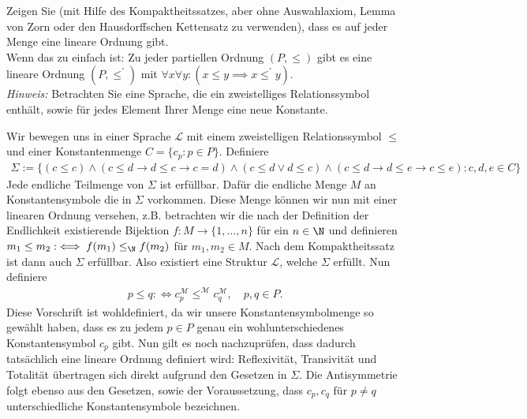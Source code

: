 
\begin{exercise}[133]

Zeigen Sie (mit Hilfe des Kompaktheitssatzes, aber ohne Auswahlaxiom, Lemma von Zorn
oder den Hausdorffschen Kettensatz zu verwenden), dass es auf jeder Menge eine
lineare Ordnung gibt. \\
Wenn das zu einfach ist: Zu jeder partiellen Ordnung $(P,\leq)$ gibt es eine
lineare Ordnung $(P,\leq^{\prime})$ mit $\forall x \forall y: (x \leq y \implies x \leq^{\prime} y)$. \\
\textit{Hinweis:} Betrachten Sie eine Sprache, die ein zweistelliges Relationssymbol
enthält, sowie für jedes Element Ihrer Menge eine neue Konstante.

\end{exercise}


\begin{solution}

Wir bewegen uns in einer Sprache $\mathscr{L}$ mit einem zweistelligen Relationssymbol $\leq$
und einer Konstantenmenge $C = \{c_p: p \in P \}$. Definiere
\begin{align*}
  \Sigma := \{(c \leq c) \land
  (c \leq d \rightarrow d \leq c \rightarrow c = d) \land
  (c \leq d \lor d \leq c) \land
  (c \leq d \rightarrow d \leq e \rightarrow c \leq e): c,d,e \in C\}
\end{align*}
Jede endliche Teilmenge von $\Sigma$ ist erfüllbar. Dafür die endliche Menge $M$
an Konstantensymbole die in $\Sigma$ vorkommen. Diese Menge können wir nun mit
einer linearen Ordnung versehen, z.B. betrachten wir die nach der Definition der
Endlichkeit existierende Bijektion $f: M \to \{1,\dots,n\}$ für ein $n \in \N$ und
definieren $m_1 \leq m_2:\iff f(m_1) \leq_\N f(m_2)$ für $m_1,m_2 \in M$.
Nach dem Kompaktheitssatz ist dann auch $\Sigma$ erfüllbar.
Also existiert eine Struktur $\mathscr{L}$, welche $\Sigma$ erfüllt. Nun definiere
\begin{align*}
  p \leq q: \iff c_p^{\mathscr{M}} \leq^{\mathscr{M}} c_q^{\mathscr{M}}, \quad p,q \in P.
\end{align*}
Diese Vorschrift ist wohldefiniert, da wir unsere Konstantensymbolmenge so
gewählt haben, dass es zu jedem $p \in P$ genau ein wohlunterschiedenes Konstantensymbol $c_p$ gibt.
Nun gilt es noch nachzuprüfen, dass dadurch tatsächlich eine lineare Ordnung definiert wird:
Reflexivität, Transivität und Totalität übertragen sich direkt aufgrund den Gesetzen in $\Sigma$.
Die Antisymmetrie folgt ebenso aus den Gesetzen, sowie der Voraussetzung, dass $c_p, c_q$
für $p \neq q$ unterschiedliche Konstantensymbole bezeichnen.
\end{solution}

